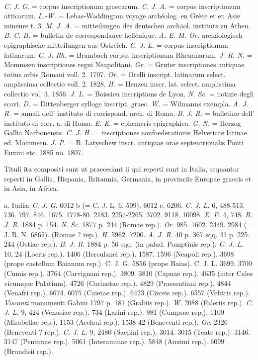 \documentclass[a4paper, 11pt, oneside, polutonikogreek, german, twocolumn]{article}
\begin{document}
\paragraph{}
\emph{C. J. G.} = corpus inscriptionum graecarum. \emph{C. J. A.} = corpus inscriptionum atticarum. \emph{L.-W.} = Lebas-Waddington voyage archéolog. en Grèce et en Asie mineure t. 3. \emph{M. J. A.} = mitteilungen des deutschen archäol. instituts zu Athen. \emph{B. C. H.} = bulletin de correspondance hellénique. \emph{A. E. M. Oe.} archäologisch-epigraphische mitteilungen aus Östreich. \emph{C. J. L.} = corpus inscriptionum latinarum. \emph{C. J. Rh.} = Brambach corpus inscriptionum Rhenanarum. \emph{J. R. N.} = Mommsen inscriptiones regni Neapolitani. \emph{Gr.} = Gruter inscriptiones antiquae totius orbis Romani voll. 2. 1707. \emph{Or.} = Orelli inscript. latinarum select. amplissima collectio voll. 2. 1828. \emph{H.} = Henzen inscr. lat. select. amplissima collectio vol. 3. 1856. \emph{J. L.} = Boissieu inscriptions de Lyon. \emph{N. Sc.} = notizie degli scavi. \emph{D.} = Dittenberger sylloge inscript. graec. \emph{W.} = Wilmanns exempla. \emph{A. J. R.} = annali dell' instituto di corrispond. arch. di Roma. \emph{B. J. R.} = bulletino dell' instituto di corr. a. di Roma. \emph{E. E.} = ephemeris epigraphica. \emph{G. N.} = Herzog Gallia Narbonensis. \emph{C. J. H.} = inscriptiones confoederationis Helveticae latinae ed. Mommsen. \emph{J. P.} = B. Latyschew inscr. antiquae orae septentrionalis Ponti Euxini etc. 1885 no. 1807.

Tituli ita compositi sunt ut praecedant ii qui reperti sunt in Italia, sequantur reperti in Gallia, Hispania, Britannia, Germania, in provinciis Europae graecis et in Asia, in Africa.

a. Italia: \emph{C. J. G.} 6012 b (= C. J. L. 6, 509). 6012 c. 6206. \emph{C. J. L.} 6, 488-513. 736. 797. 846. 1675. 1778-80. 2183. 2257-2265. 3702. 9118. 10098. \emph{E. E.} 4, 748. \emph{B. J. R.} 1884 p. 154. \emph{N. Sc.} 1877 p. 244 (Romae rep.). \emph{Or.} 985. 1602. 2449. 2984 (= J. R. N. 6865). (Romae ? rep.). \emph{H.} 5962. 7200. \emph{A. J. R.} 40 p. 367 sqq. 41 p. 225. 244 (Ostiae rep.). \emph{B. J. R.} 1884 p. 56 sqq. (in palud. Pomptinis rep.). \emph{C. J. L.} 10, 24 (Locris rep.). 1406 (Herculanei rep.). 1587. 1596 (Neapoli rep.). 3698 (prope castellum Baianum rep.). C. J. G. 5856 (prope Baias). C. J. L. 3699. 3700 (Cumis rep.). 3764 (Carvignani rep.). 3809. 3810 (Capuae rep.). 4635 (inter Cales vicumque Palatium). 4726 (Carinotae rep.). 4829 (Praesentiani rep.). 4844 (Venafri rep.). 6074. 6075 (Caietae rep.). 6423 (Circeis rep.). 6557 (Velitris rep.). \emph{Visconti} monumenti Gabini 1797 p. 181 (Grabiis rep.). \emph{W.} 2088 (Faleriis rep.). \emph{C. J. L.} 9, 424 (Venusiae rep.). 734 (Larini rep.). 981 (Compsae rep.). 1100 (Mirabellae rep.). 1153 (Aeclaui rep.). 1538-42 (Beneventi rep.). \emph{Or.} 2326 (Beneventi ? rep.). \emph{C. J. L.} 9, 2480 (Saepini rep.). 3014. 3015 (Teate rep.). 3146. 3147 (Pentimae rep.). 5061 (Interamniae rep.). 5848 (Auximi rep.). 6099 (Brundisii rep.).
\end{document}
